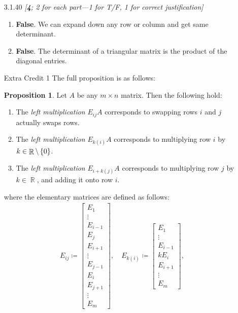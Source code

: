 \documentclass{amsart}
\theoremstyle{definition}
\newtheorem{proposition}[definition]{Proposition}
\theoremstyle{definition}
\DeclareMathOperator{\R}{\mathbb{R}}
\DeclareMathOperator{\1}{\mathbbm{1}}
\begin{document}
\begin{enumerate}[itemsep = 2mm]
		\item[3.1.40]  \textit{[\textbf{4}; 2 for each part---1 for T/F, 1 for correct justification]}
		
		\begin{enumerate}
			\item \textbf{False}. We can expand down any row or column and get same determinant.
			
			
			\item \textbf{False}. The determinant of a triangular matrix is the product of the diagonal entries.
		\end{enumerate}
		
		\clearpage
		
		\item[Extra Credit 1] The full proposition is as follows:
		
		\begin{proposition}
			\label{prop1}
			Let $A$ be any $m\times n$ matrix. Then the following hold:
			\begin{enumerate}
				\item The \textit{left multiplication} $E_{ij} A$ corresponds to swapping rows $i$ and $j$ actually swaps rows. 
				\item The \textit{left multiplication} $E_{k (i)} A$ corresponds to multiplying row $i$ by $k \in \R \setminus \set{0}$.
				\item The \textit{left multiplication} $E_{i + k (j)} A$ corresponds to multiplying row $j$ by $k \in \R$, and adding it onto row $i$.
			\end{enumerate}
			where the elementary matrices are defined as follows:
			\begin{align*}
			E_{ij} \coloneqq \begin{bmatrix} E_1 \\ \vdots \\ E_{i-1} \\ E_{j} \\ E_{i+1} \\ \vdots \\ E_{j-1} \\ E_i \\ E_{j+1} \\ \vdots \\ E_m \end{bmatrix}, \quad 
			E_{k(i)} \coloneqq \begin{bmatrix} E_1 \\ \vdots \\ E_{i-1} \\ k E_{i} \\ E_{i+1} \\ \vdots \\ E_m \end{bmatrix}, \quad

\end{align*}
\end{proposition}
\end{enumerate}
\end{document}
